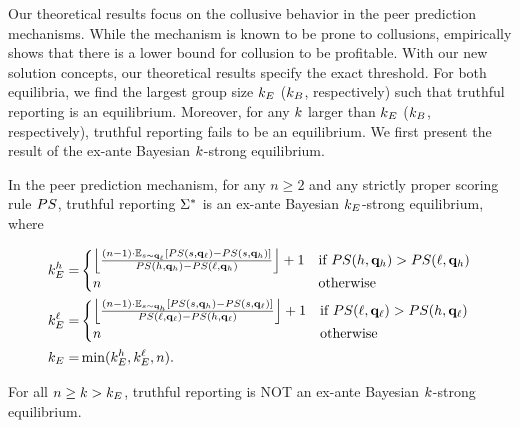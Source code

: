 Our theoretical results focus on the collusive behavior in the peer prediction mechanisms. While the mechanism is known to be prone to collusions, \citet{Shnayder2016practcal} empirically shows that there is a lower bound for collusion to be profitable. With our new solution concepts, our theoretical results specify the exact threshold. 
For both equilibria, we find the largest group size $k_E$ ($k_B$, respectively) such that truthful reporting is an equilibrium. Moreover, for any $k$ larger than $k_E$ ($k_B$, respectively), truthful reporting fails to be an equilibrium. We first present the result of the ex-ante Bayesian $k$-strong equilibrium. 

\begin{theorem}
\label{thm:pp_exante}
    In the peer prediction mechanism, for any $n \ge 2$ and any strictly proper scoring rule $PS$, truthful reporting $\Sigma^*$ is an ex-ante Bayesian $k_E$-strong equilibrium, where 
    \begin{small}
        \begin{align*}
        \kde^h =& \begin{cases}
           \left\lfloor\frac{(\ag - 1)\cdot \Ex_{\sigi\sim \vpr_{\ell}}[\ps(\sigi, \vpr_{\ell}) - \ps(\sigi, \vpr_{h})]}{\ps(h, \vpr_h) - \ps(\ell, \vpr_h)}  \right\rfloor + 1 & \text{if}\ \ps(h, \vpr_h) > \ps(\ell, \vpr_h) \\
           n & \text{otherwise}
        \end{cases}\\
        \kde^\ell =& \begin{cases}
           \left\lfloor\frac{(\ag - 1)\cdot \Ex_{\sigi\sim \vpr_{h}}[\ps(\sigi, \vpr_{h}) - \ps(\sigi, \vpr_{\ell})]}{\ps(\ell, \vpr_\ell) - \ps(h, \vpr_\ell)}\right\rfloor + 1 & \text{if}\ \ps(\ell, \vpr_\ell) > \ps(h, \vpr_\ell)\\
           n & \text{otherwise}
        \end{cases}\\
        \kde =&  \min(\kde^h, \kde^{\ell}, n). 
    \end{align*}
    \end{small}
    
    For all $n\ge k > k_E$, truthful reporting is NOT an ex-ante Bayesian $k$-strong equilibrium. 
\end{theorem}

